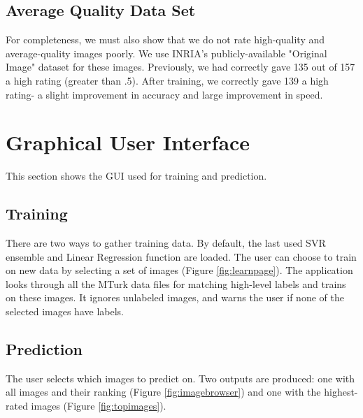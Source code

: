 \documentclass[11pt,letter]{article}
\begin{document}
\subsection{Average Quality Data Set}
For completeness, we must also show that we do not rate high-quality and average-quality images poorly. We use INRIA's publicly-available "Original Image" dataset\cite{JDS08} for these images. Previously, we had correctly gave 135 out of 157 a high rating (greater than .5). After training, we correctly gave 139 a high rating- a slight improvement in accuracy and large improvement in speed.

\appendix
\section{Graphical User Interface}
This section shows the GUI used for training and prediction.

\subsection{Training}
There are two ways to gather training data. By default, the last used SVR ensemble and Linear Regression function are loaded. The user can choose to train on new data by selecting a set of images (Figure \ref{fig:learnpage}). The application looks through all the MTurk data files for matching high-level labels and trains on these images. It ignores unlabeled images, and warns the user if none of the selected images have labels.

\begin{figure*}[h!]
  \centering
  \caption{When learning, the user has two options. The first option is to choose a new set of images to train on. The second is to select saved training data.}
  \label{fig:learnpage}
\end{figure*}

\subsection{Prediction}
The user selects which images to predict on. Two outputs are produced: one with all images and their ranking (Figure \ref{fig:imagebrowser}) and one with the highest-rated images (Figure \ref{fig:topimages}).

\begin{figure*}[h!]
  \centering
  \caption{This interface shows the list of images with some of their low-level rankings and final prediction.}
  \label{fig:imagebrowser}
\end{figure*}
\end{document}
